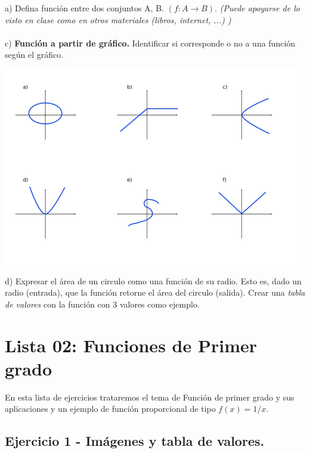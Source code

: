 \documentclass[11pt, a4paper]{article}
\begin{document}
a) Defina funci\'on entre dos conjuntos A, B. {\color{blue}$( f: A \to B )$}. \textit{(Puede apoyarse de lo visto en clase como en otros materiales (libros, internet,
...) )}  \\ \\
c) \textbf{ Funci\'on a partir de gr\'afico. } Identificar si corresponde o no a una funci\'on seg\'un el gr\'afico. \\
\begin{center}
\includegraphics[scale = 0.8]{graficaFuncion.png}
\end{center}
d) Expresar el \'area de un circulo como una funci\'on de su radio. Esto es, dado un radio {\color{blue}(entrada)}, que la funci\'on retorne el \'area del circulo {\color{blue}(salida)}. Crear una \textit{tabla de valores} con la funci\'on con 3 valores como ejemplo. 

\newpage


\section{ Lista 02: Funciones de Primer grado }

En esta lista de ejercicios trataremos el tema de Funci\'on de primer grado y sus aplicaciones y un ejemplo de funci\'on proporcional de tipo $f(x) = 1/x$.   \\

\subsection*{ Ejercicio 1 - Im\'agenes y tabla de valores. }
\end{document}
